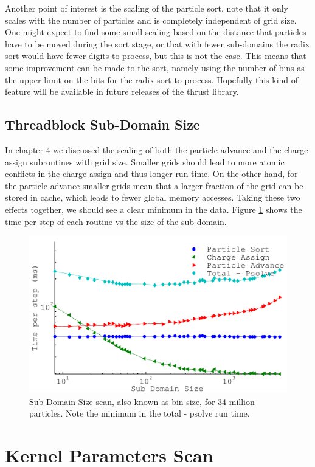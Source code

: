 Another point of interest is the scaling of the particle sort, note that it only scales with the number of particles and is completely independent of grid size. One might expect to find some small scaling based on the distance that particles have to be moved during the sort stage, or that with fewer sub-domains the radix sort would have fewer digits to process, but this is not the case. This means that some improvement can be made to the sort, namely using the number of bins as the upper limit on the bits for the radix sort to process. Hopefully this kind of feature will be available in future releases of the thrust library.



\subsection{Threadblock Sub-Domain Size}
In chapter 4 we discussed the scaling of both the particle advance and the charge assign subroutines with grid size. Smaller grids should lead to more atomic conflicts in the charge assign and thus longer run time. On the other hand, for the particle advance smaller grids mean that a larger fraction of the grid can be stored in cache, which leads to fewer global memory accesses. Taking these two effects together, we should see a clear minimum in the data. Figure \ref{fig:subdomain_size_scan} shows the time per step of each routine vs the size of the sub-domain. 

\begin{figure}[H]
\begin{center}
\includegraphics[width=6in]{performance/gridshape_scan.pdf}
\end{center}
\caption{Sub Domain Size scan, also known as bin size, for 34 million particles. Note the minimum in the total - psolve run time.}
\label{fig:subdomain_size_scan}
\end{figure}



	\section{Kernel Parameters Scan}


